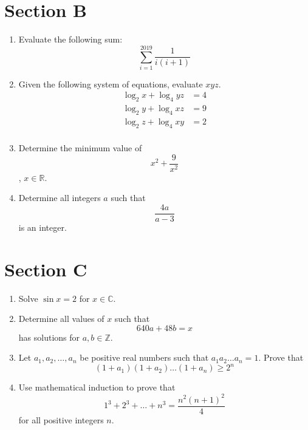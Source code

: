 \documentclass[12pt]{article}
\begin{document}
\section*{Section B}
\begin{enumerate}
    \item Evaluate the following sum: $$\sum_{i = 1}^{2019} \frac{1}{i(i + 1)}$$ \bspace
    \item Given the following system of equations, evaluate $xyz$.
    \begin{align*}
        \log_2{x} + \log_4{yz} &= 4 \\
        \log_2{y} + \log_4{xz} &= 9 \\
        \log_2{z} + \log_4{xy} &= 2 \\
    \end{align*} \bspace
    \item Determine the minimum value of $$x^2 + \frac{9}{x^2}$$, $x \in \mathbb{R}$. \bspace
    \item Determine all integers $a$ such that $$\frac{4a}{a - 3}$$ is an integer. \bspace
\end{enumerate}

\section*{Section C}
\begin{enumerate}
    \item Solve $\sin{x} = 2$ for $x \in \mathbb{C}$. \cspace
    \item Determine all values of $x$ such that $$640a + 48b = x$$ has solutions for $a, b \in \mathbb{Z}$. \cspace
    \item Let $a_1, a_2, \dots, a_n$ be positive real numbers such that $a_1 a_2 \dots a_n = 1$. Prove that $$(1 + a_1)(1 + a_2)\dots (1 + a_n) \geq 2^n$$ \cspace
    \item Use mathematical induction to prove that $$1^3 + 2^3 + \dots + n^3 = \frac{n^2(n + 1)^2}{4}$$ for all positive integers $n$. \cspace
\end{enumerate}
\end{document}
